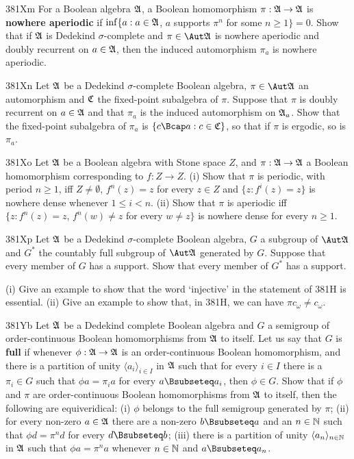 {\spheader 381Xm For a Boolean algebra $\frak A$, a Boolean homomorphism
$\pi:\frak A\to\frak A$ is {\bf nowhere aperiodic} if
$\inf\{a:a\in\frak A$, $a$ supports $\pi^n$ for some $n\ge 1\}=0$.
Show that if $\frak A$ is Dedekind $\sigma$-complete and
$\pi\in\Aut\frak A$ is nowhere aperiodic and doubly recurrent on
$a\in\frak A$, then the induced automorphism $\pi_a$ is nowhere
aperiodic.

\spheader 381Xn Let $\frak A$ be a Dedekind $\sigma$-complete Boolean
algebra, $\pi\in\Aut\frak A$ an automorphism and $\frak C$ the
fixed-point subalgebra of $\pi$.   Suppose that $\pi$ is doubly
recurrent on $a\in\frak A$ and that $\pi_a$ is the induced automorphism
on $\frak A_a$.   Show that the fixed-point subalgebra of $\pi_a$ is
$\{c\Bcap a:c\in\frak C\}$, so that if $\pi$ is ergodic, so is
$\pi_a$.

\spheader 381Xo Let $\frak A$ be a Boolean algebra with Stone space $Z$,
and $\pi:\frak A\to\frak A$ a Boolean homomorphism corresponding to
$f:Z\to Z$.   (i) Show that $\pi$ is periodic, with period $n\ge 1$, iff
$Z\ne\emptyset$,
$f^n(z)=z$ for every $z\in Z$ and $\{z:f^i(z)=z\}$ is nowhere dense
whenever $1\le i<n$.   (ii) Show that $\pi$ is aperiodic iff
$\{z:f^n(z)=z$, $f^n(w)\ne z$ for every $w\ne z\}$ is nowhere dense for
every $n\ge 1$.

\spheader 381Xp Let $\frak A$ be a Dedekind $\sigma$-complete Boolean
algebra, $G$ a subgroup of $\Aut\frak A$ and
$G^*$ the countably full subgroup
of $\Aut\frak A$ generated by $G$.   Suppose that every member of $G$ has a
support.   Show that every member of $G^*$ has a support.

(i) Give an example to show that the word `injective' in
the statement of 381H is essential.   (ii) Give an example to show that, in
381H, we can have $\pi c_{\omega}\ne c_{\omega}$.

\spheader 381Yb %
Let $\frak A$ be a Dedekind complete Boolean algebra and
$G$ a semigroup of order-continuous Boolean homomorphisms from $\frak A$
to itself.   Let us say that $G$ is {\bf full} if whenever
$\phi:\frak A\to\frak A$ is an order-continuous Boolean homomorphism,
and there is a
partition of unity $\langle a_i\rangle_{i\in I}$ in $\frak A$ such that
for every $i\in I$ there is a $\pi_i\in G$ such that $\phi a=\pi_i a$
for every $a\Bsubseteq a_i$, then $\phi\in G$.   Show that if $\phi$ and
$\pi$ are order-continuous Boolean homomorphisms from $\frak A$ to
itself, then the following are equiveridical:  (i) $\phi$ belongs to the
full semigroup generated by $\pi$;  (ii) for every non-zero
$a\in\frak A$ there are a non-zero $b\Bsubseteq a$ and an $n\in\Bbb N$
such that
$\phi d=\pi^nd$ for every $d\Bsubseteq b$;  (iii) there is a partition
of unity $\langle a_n\rangle_{n\in\Bbb N}$ in $\frak A$ such that
$\phi a=\pi^na$ whenever $n\in\Bbb N$ and $a\Bsubseteq a_n$.

}
